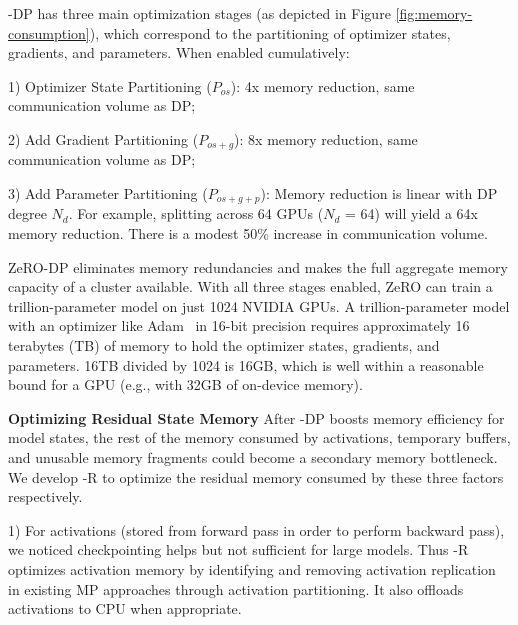 \name-DP has three main optimization stages (as depicted in Figure \ref{fig:memory-consumption}), which correspond to the partitioning of optimizer states, gradients, and parameters. When enabled cumulatively:

1) Optimizer State Partitioning ($P_{os}$): 4x memory reduction, same communication volume as DP;

2) Add Gradient Partitioning ($P_{os+g}$): 8x memory reduction, same communication volume as DP; 

3) Add Parameter Partitioning ($P_{os+g+p}$): Memory reduction is linear with DP degree $N_d$. For example, splitting across 64 GPUs ($N_d$ = 64) will yield a 64x memory reduction. There is a modest 50\% increase in communication volume.

ZeRO-DP eliminates memory redundancies and makes the full aggregate memory capacity of a cluster available. With all three stages enabled, ZeRO can train a trillion-parameter model on just 1024 NVIDIA GPUs. A trillion-parameter model with an optimizer like Adam~\cite{DBLP:journals/corr/Adam} in 16-bit precision requires approximately 16 terabytes (TB) of memory to hold the optimizer states, gradients, and parameters. 16TB divided by 1024 is 16GB, which is well within a reasonable bound for a GPU (e.g., with 32GB of on-device memory).


{\bf Optimizing Residual State Memory}
After \name-DP boosts memory efficiency for model states, the rest of the memory consumed by activations, temporary buffers, and unusable memory fragments could become a secondary memory bottleneck.  We develop \name-R to optimize the residual memory consumed by these three factors respectively.  

1) For activations (stored from forward pass in order to perform backward pass), we noticed checkpointing \cite{DBLP:journals/corr/ChenXZG16} helps but not sufficient for large models.  
Thus \name-R optimizes activation memory by identifying and removing activation replication in existing MP approaches through activation partitioning. It also offloads activations to CPU when appropriate.

